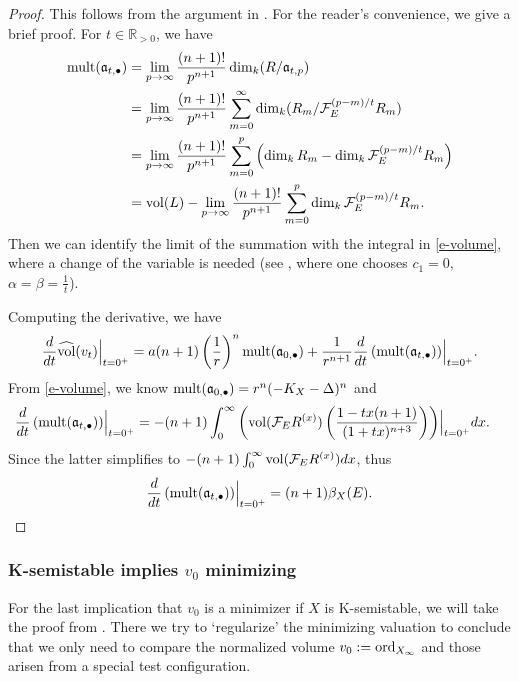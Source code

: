 \documentclass[12pt,reqno]{amsart}%
\newcommand{\cF}{\mathcal{F}}
\newcommand{\mult}{{\rm mult}}
\newcommand{\ord}{{\rm ord}}
\theoremstyle{definition}
\newtheorem{rem}[thm]{Remark}
\theoremstyle{remark}
\newcommand{\vol}{{\rm vol}}
\newcommand{\hvol}{\widehat{\rm vol}}
\newcommand{\fa}{{\mathfrak{a}}}
\newcommand{\R}{{\mathbb{R}}}
\begin{document}
\begin{subappendices}
\begin{proof}
This follows from the argument in \cite[(18)-(25)]{Li17}. For the reader's convenience, we give a brief proof.
For $t\in \R_{>0 }$, we have 
\begin{align*}
\mult(\fa_{t,\bullet })&=\lim_{p\to \infty}  \frac{(n+1)!}{p^{n+1}}\dim_k (R/\fa_{t,p})\\
&=\lim_{p\to \infty}  \frac{(n+1)!}{p^{n+1}}\sum^{\infty}_{m=0}\dim_k  (R_m/ \cF_E^{{(p-m)}/{t}} R_m ) \\
&=\lim_{p\to \infty}  \frac{(n+1)!}{p^{n+1}}\sum^{p}_{m=0}\left(\dim_k R_m - \dim_k  \cF_E^{{(p-m)}/{t}} R_m \right)\\
& = \vol(L)  - \lim_{p\to \infty}  \frac{(n+1)!}{p^{n+1}} \sum_{m=0}^p \dim_k \cF_E^{{(p-m)}/{t}} R_m .
\end{align*}
Then we can identify the limit of the summation with the integral in \eqref{e-volume}, where a change of the variable is needed (see \cite[(25)]{Li17}, where  one chooses $c_1=0$, $\alpha=\beta=\frac{1}{t}$). 

Computing the derivative, we have 
$$
\frac{d}{dt}\hvol(v_t) \Bigr \rvert_{t=0^+} =a(n+1)\left(\frac{1}{r}\right)^n\mult(\fa_{0,\bullet} )+ \frac{1}{r^{n+1}} \frac{d}{dt} \left(\mult (\fa_{t, \bullet} )\right)\Bigr\rvert_{t=0^+}.$$
From \eqref{e-volume}, we know $\mult(\fa_{0,\bullet})=r^n(-K_X-\Delta)^n$
and
\begin{align*}
 \frac{d}{dt} \left( \mult(\fa_{t,\bullet} ) \right) \Bigr\rvert_{t=0^+}&=-
 (n+1)\int_0^\infty   \left( \vol(\cF_E R^{(x)})\left( \frac{ 1-tx(n+1)}{(1+tx)^{n+3} } \right) \right) \Bigr\rvert_{t=0^+}dx
.  \end{align*}
Since the latter simplifies to $-(n+1)\int^{\infty}_{0} \vol (\cF_E R^{(x)})dx$, thus
\[
\frac{d}{dt} \left( \mult(\fa_{t,\bullet} ) \right) \Bigr\rvert_{t=0^+}=(n+1)\beta_X(E).
\]
\end{proof}

\subsubsection*{K-semistable implies $v_0$ minimizing}
For the last implication that $v_0$ is a minimizer if $X$ is K-semistable, we will take the proof from \cite{LX20}. There we try to `regularize' the minimizing valuation to conclude that we only need to compare the normalized volume $v_0:=\ord_{X_{\infty}}$ and those arisen from a special test configuration. 


\end{subappendices}
\end{document}
